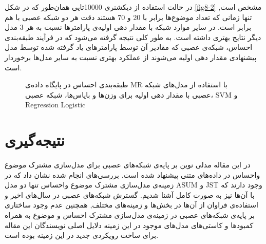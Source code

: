 \documentclass[12pt,a4paper]{article}
\begin{document}
در حالت استفاده از دیکشنری 10000تایی همان‌طور که در شکل 
\ref{fig8-2}
مشخص است, تنها زمانی که تعداد موضوع‌ها برابر با 20 و 70 هستند دقت هر دو شبکه عصبی با هم برابر است. در سایر موارد شبکه با مقدار دهی اولیه‌ی پارامترها نسبت به هر 3 مدل دیگر نتایج بهتری داشته است. به طور کلی نتیجه گرفته می‌شود که در فرآیند طبقه‌بندی احساس، شبکه‌ی عصبی که مقادیر آن توسط پارامترهای یاد گرفته شده توسط مدل پیشنهادی مقدار دهی اولیه می‌شوند از عملکرد بهتری نسبت به سایر مدل‌ها برخوردار است.
\begin{figure}[!t]
	\centering
	\caption{طبقه‌بندی احساس در پایگاه داده‌ی MR با استفاده از مدل‌های شبکه عصبی با مقدار دهی اولیه برای وزن‌ها و بایاس‌ها، شبکه عصبی، SVM و Regression Logistic}
	\label{fig8}
\end{figure}

\section{نتیجه‌گیری}
\label{sec5}

در این مقاله مدلی نوین بر پایه‌ی شبکه‌های عصبی برای مدل‌سازی مشترک موضوع واحساس در داده‌های متنی  پیشنهاد شده است. بررسی‌های انجام شده نشان داد که در زمینه‌ی مدل‌سازی مشترک موضوع واحساس تنها دو مدل ASUM و JST وجود دارند که با آن‌ها نیز به صورت کامل آشنا شدیم. گسترش شبکه‌های عصبی در سال‌های اخیر و استفاده‌ی فراوان از آن‌ها در بخش‌ها و زمینه‌های مختلف, همچنین عدم وجود ساختاری بر پایه‌ی شبکه‌های عصبی در زمینه‌ی مدل‌سازی مشترک احساس و موضوع به همراه کمبودها و کاستی‌های مدل‌های موجود در این زمینه دلایل اصلی نویسندگان این مقاله برای ساخت رویکردی جدید در این زمینه بوده است.
\end{document}
